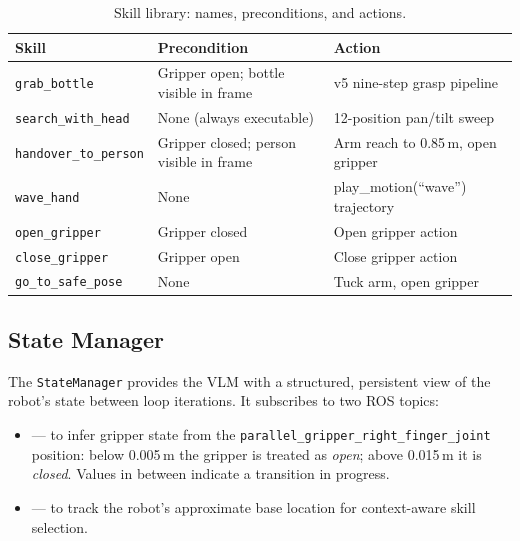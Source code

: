 \begin{table}[H]
\centering
\caption{Skill library: names, preconditions, and actions.}
\label{tab:skill_library}
\begin{tabularx}{\linewidth}{lXX}
\toprule
\textbf{Skill} & \textbf{Precondition} & \textbf{Action} \\
\midrule
\texttt{grab\_bottle}       & Gripper open; bottle visible in frame
                             & v5 nine-step grasp pipeline \\
\texttt{search\_with\_head} & None (always executable)
                             & 12-position pan/tilt sweep \\
\texttt{handover\_to\_person} & Gripper closed; person visible in frame
                             & Arm reach to 0.85\,m, open gripper \\
\texttt{wave\_hand}         & None
                             & play\_motion(``wave'') trajectory \\
\texttt{open\_gripper}      & Gripper closed
                             & Open gripper action \\
\texttt{close\_gripper}     & Gripper open
                             & Close gripper action \\
\texttt{go\_to\_safe\_pose} & None
                             & Tuck arm, open gripper \\
\bottomrule
\end{tabularx}
\end{table}

\subsection{State Manager}

The \texttt{StateManager} provides the VLM with a structured, persistent view
of the robot's state between loop iterations.
It subscribes to two ROS topics:

\begin{sloppypar}
\begin{itemize}
  \item {} --- to infer gripper state from the
        \texttt{parallel\_gripper\_right\_finger\_joint} position:
        below 0.005\,m the gripper is treated as \emph{open};
        above 0.015\,m it is \emph{closed}.
        Values in between indicate a transition in progress.

  \item {} --- to track the robot's
        approximate base location for context-aware skill selection.
\end{itemize}
\end{sloppypar}


